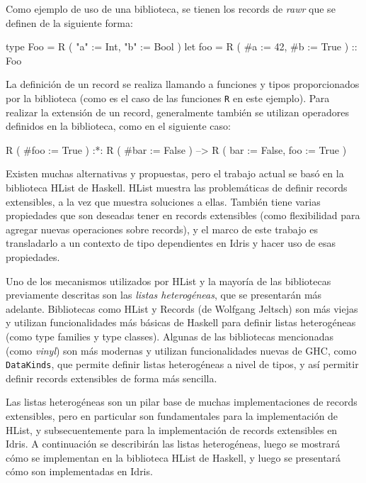 Como ejemplo de uso de una biblioteca, se tienen los records de \textit{rawr} que se definen de la siguiente forma:

\begin{code}
type Foo = R ( "a" := Int, "b" := Bool )
let foo = R ( #a := 42, #b := True ) :: Foo
\end{code}

La definición de un record se realiza llamando a funciones y tipos proporcionados por la biblioteca (como es el caso de las funciones \texttt{R} en este ejemplo). Para realizar la extensión de un record, generalmente también se utilizan operadores definidos en la biblioteca, como en el siguiente caso:

\begin{code}
R ( #foo := True ) :*: R ( #bar := False )
--> R ( bar := False, foo := True )
\end{code}

Existen muchas alternativas y propuestas, pero el trabajo actual se basó en la biblioteca HList de Haskell. HList muestra las problemáticas de definir records extensibles, a la vez que muestra soluciones a ellas. También tiene varias propiedades que son deseadas tener en records extensibles (como flexibilidad para agregar nuevas operaciones sobre records), y el marco de este trabajo es transladarlo a un contexto de tipo dependientes en Idris y hacer uso de esas propiedades.

Uno de los mecanismos utilizados por HList y la mayoría de las bibliotecas previamente descritas son las \textit{listas heterogéneas}, que se presentarán más adelante. Bibliotecas como HList y Records (de Wolfgang Jeltsch) son más viejas y utilizan funcionalidades más básicas de Haskell para definir listas heterogéneas (como type families y type classes). Algunas de las bibliotecas mencionadas (como \textit{vinyl}) son más modernas y utilizan funcionalidades nuevas de GHC, como \texttt{DataKinds}, que permite definir listas heterogéneas a nivel de tipos, y así permitir definir records extensibles de forma más sencilla.

Las listas heterogéneas son un pilar base de muchas implementaciones de records extensibles, pero en particular son fundamentales para la implementación de HList, y subsecuentemente para la implementación de records extensibles en Idris. A continuación se describirán las listas heterogéneas, luego se mostrará cómo se implementan en la biblioteca HList de Haskell, y luego se presentará cómo son implementadas en Idris.

